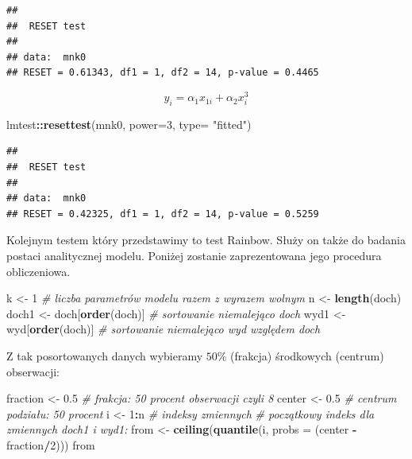 \documentclass[polish,]{book}
\newenvironment{Shaded}{\begin{snugshade}}{\end{snugshade}}
\newcommand{\CommentTok}[1]{\textcolor[rgb]{0.56,0.35,0.01}{\textit{#1}}}
\newcommand{\DataTypeTok}[1]{\textcolor[rgb]{0.13,0.29,0.53}{#1}}
\newcommand{\DecValTok}[1]{\textcolor[rgb]{0.00,0.00,0.81}{#1}}
\newcommand{\FloatTok}[1]{\textcolor[rgb]{0.00,0.00,0.81}{#1}}
\newcommand{\KeywordTok}[1]{\textcolor[rgb]{0.13,0.29,0.53}{\textbf{#1}}}
\newcommand{\NormalTok}[1]{#1}
\newcommand{\OperatorTok}[1]{\textcolor[rgb]{0.81,0.36,0.00}{\textbf{#1}}}
\newcommand{\StringTok}[1]{\textcolor[rgb]{0.31,0.60,0.02}{#1}}
\begin{document}
\begin{verbatim}
## 
##  RESET test
## 
## data:  mnk0
## RESET = 0.61343, df1 = 1, df2 = 14, p-value = 0.4465
\end{verbatim}

\begin{equation}
y_i=\alpha_1x_{1i}+\alpha_2x^3_i
\label{eq:wz137}
\end{equation}

\begin{Shaded}
\begin{Highlighting}[]
\NormalTok{lmtest}\OperatorTok{::}\KeywordTok{resettest}\NormalTok{(mnk0, }\DataTypeTok{power=}\DecValTok{3}\NormalTok{, }\DataTypeTok{type=} \StringTok{"fitted"}\NormalTok{)}
\end{Highlighting}
\end{Shaded}

\begin{verbatim}
## 
##  RESET test
## 
## data:  mnk0
## RESET = 0.42325, df1 = 1, df2 = 14, p-value = 0.5259
\end{verbatim}

Kolejnym testem który przedstawimy to test Rainbow. Służy on także do badania postaci analitycznej modelu. Poniżej zostanie zaprezentowana jego procedura
obliczeniowa.

\begin{Shaded}
\begin{Highlighting}[]
\NormalTok{k <-}\StringTok{ }\DecValTok{1} \CommentTok{# liczba parametrów modelu razem z wyrazem wolnym}
\NormalTok{n <-}\StringTok{ }\KeywordTok{length}\NormalTok{(doch)}
\NormalTok{doch1 <-}\StringTok{ }\NormalTok{doch[}\KeywordTok{order}\NormalTok{(doch)] }\CommentTok{# sortowanie niemalejąco doch}
\NormalTok{wyd1 <-}\StringTok{ }\NormalTok{wyd[}\KeywordTok{order}\NormalTok{(doch)]  }\CommentTok{# sortowanie niemalejąco wyd względem doch}
\end{Highlighting}
\end{Shaded}

Z tak posortowanych danych wybieramy \(50\%\) (frakcja) środkowych (centrum) obserwacji:

\begin{Shaded}
\begin{Highlighting}[]
\NormalTok{fraction <-}\StringTok{ }\FloatTok{0.5} \CommentTok{# frakcja: 50 procent obserwacji czyli 8}
\NormalTok{center <-}\StringTok{ }\FloatTok{0.5}   \CommentTok{# centrum podziału: 50 procent}
\NormalTok{i <-}\StringTok{ }\DecValTok{1}\OperatorTok{:}\NormalTok{n        }\CommentTok{# indeksy zmiennych}
\CommentTok{# początkowy indeks dla zmiennych doch1 i wyd1:}
\NormalTok{from <-}\StringTok{ }\KeywordTok{ceiling}\NormalTok{(}\KeywordTok{quantile}\NormalTok{(i, }\DataTypeTok{probs =}\NormalTok{ (center }\OperatorTok{-}\StringTok{ }\NormalTok{fraction}\OperatorTok{/}\DecValTok{2}\NormalTok{)))}
\NormalTok{from}
\end{Highlighting}
\end{Shaded}
\end{document}
